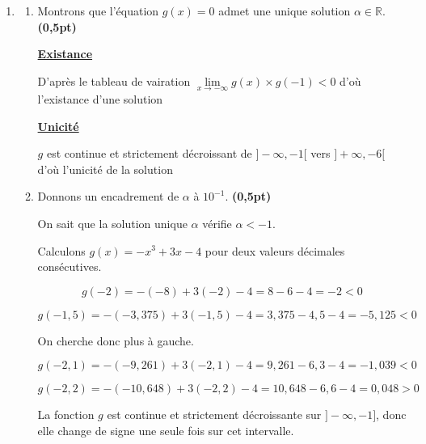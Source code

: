 \documentclass[12pt,a4paper]{article}
\begin{document}
\begin{enumerate}
$
\begin{aligned}
g(1) &= -(1)^3 + 3(1) - 4\\
g(1) &= -1 +3 - 4\\
      &=-2							
\end{aligned}
$

    
    \item 
    \begin{enumerate}
        \item Montrons que l'équation $g(x)=0$ admet une unique solution $\alpha \in \mathbb{R}$. \textbf{(0,5pt)}

\underline{\textbf{Existance}}

D'après le tableau de vairation $\lim\limits_{x \to -\infty}g(x) \times g(-1) < 0 $ d'où l'existance d'une solution

\underline{\textbf{Unicité}}

$g$ est continue et strictement décroissant de $]-\infty , -1[$ vers $]+\infty , -6[$ d'où l'unicité de la solution      
        
        \item Donnons un encadrement de $\alpha$ à $10^{-1}$. \textbf{(0,5pt)}

On sait que la solution unique $\alpha$ vérifie $\alpha<-1$.

Calculons $g(x)=-x^3+3x-4$ pour deux valeurs décimales consécutives.

\[
g(-2)= -(-8)+3(-2)-4 = 8-6-4 = -2 < 0
\]

\[
g(-1{,}5)= -(-3{,}375)+3(-1{,}5)-4 = 3{,}375-4{,}5-4 = -5{,}125 < 0
\]

On cherche donc plus à gauche.

\[
g(-2{,}1)= -(-9{,}261)+3(-2{,}1)-4 = 9{,}261-6{,}3-4 = -1{,}039 < 0
\]

\[
g(-2{,}2)= -(-10{,}648)+3(-2{,}2)-4 = 10{,}648-6{,}6-4 = 0{,}048 > 0
\]

La fonction $g$ est continue et strictement décroissante sur $]-\infty,-1]$, donc elle change de signe une seule fois sur cet intervalle.

\bigskip


\end{enumerate}
\end{enumerate}
\end{document}
